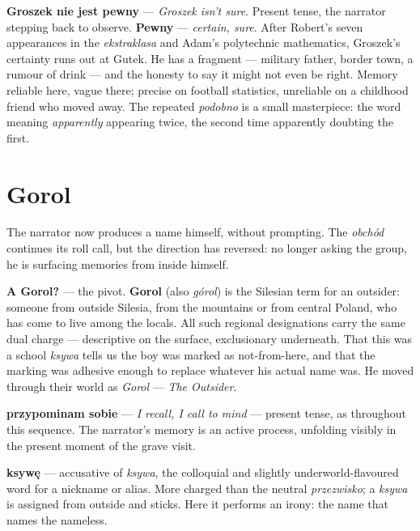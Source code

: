 \textbf{Groszek nie jest pewny} --- \textit{Groszek isn't sure}.
Present tense, the narrator stepping back to observe.
\textbf{Pewny} --- \textit{certain, sure}. After Robert's seven
appearances in the \textit{ekstraklasa} and Adam's polytechnic
mathematics, Groszek's certainty runs out at Gutek. He has a
fragment --- military father, border town, a rumour of drink ---
and the honesty to say it might not even be right. Memory
reliable here, vague there; precise on football statistics,
unreliable on a childhood friend who moved away. The repeated
\textit{podobno} is a small masterpiece: the word meaning
\textit{apparently} appearing twice, the second time apparently
doubting the first.

\section{Gorol}



The narrator now produces a name himself, without prompting. The
\textit{obchód} continues its roll call, but the direction has
reversed: no longer asking the group, he is surfacing memories
from inside himself.

\textbf{A Gorol?} --- the pivot. \textbf{Gorol} (also
\textit{górol}) is the Silesian term for an outsider: someone
from outside Silesia, from the mountains or from central Poland,
who has come to live among the locals. All such regional
designations carry the same dual charge --- descriptive on the
surface, exclusionary underneath. That this was a school
\textit{ksywa} tells us the boy was marked as not-from-here, and
that the marking was adhesive enough to replace whatever his
actual name was. He moved through their world as \textit{Gorol}
--- \textit{The Outsider}.

\textbf{przypominam sobie} --- \textit{I recall, I call to mind}
--- present tense, as throughout this sequence. The narrator's
memory is an active process, unfolding visibly in the present
moment of the grave visit.

\textbf{ksywę} --- accusative of \textit{ksywa}, the colloquial
and slightly underworld-flavoured word for a nickname or alias.
More charged than the neutral \textit{przezwisko}; a
\textit{ksywa} is assigned from outside and sticks. Here it
performs an irony: the name that names the nameless.

